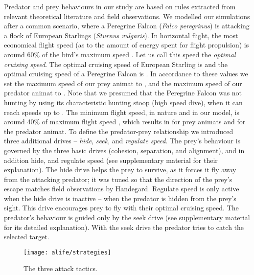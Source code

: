 Predator and prey behaviours in our study are based on rules extracted from relevant theoretical literature and field observations. We modelled our simulations after a common scenario, where a Peregrine Falcon (\emph{Falco peregrinus}) is attacking a flock of European Starlings (\emph{Sturnus vulgaris}). In horizontal flight, the most economical flight speed (as to the amount of energy spent for flight propulsion) is around 60\% of the bird's maximum speed \cite{tennekes2009simple}. Let us call this speed the \emph{optimal cruising speed}. The optimal cruising speed of European Starling is  and the optimal cruising speed of a Peregrine Falcon is  \cite{tennekes2009simple}. In accordance to these values we set the maximum speed of our prey animat to , and the maximum speed of our predator animat to . Note that we presumed that the Peregrine Falcon was not hunting by using its characteristic hunting stoop (high speed dive), when it can reach speeds up to  \cite{tucker1998gliding}. The minimum flight speed, in nature and in our model, is around 40\% of maximum flight speed \cite{tennekes2009simple}, which results in  for prey animats and  for the predator animat. To define the predator-prey relationship we introduced three additional drives -- \emph{hide}, \emph{seek}, and \emph{regulate speed}. The prey's behaviour is governed by the three basic drives (cohesion, separation, and alignment), and in addition hide, and regulate speed (see supplementary material for their explanation). The hide drive helps the prey to survive, as it forces it fly away from the attacking predator; it was tuned so that the direction of the prey's escape matches field observations by Handegard\etal \cite{handegard2012dynamics}. Regulate speed is only active when the hide drive is inactive -- when the predator is hidden from the prey's sight. This drive encourages prey to fly with their optimal cruising speed. The predator's behaviour is guided only by the seek drive (see supplementary material for its detailed explanation). With the seek drive the predator tries to catch the selected target.

\begin{figure}
	\texttt{[image: alife/strategies]}
	\caption{The three attack tactics.}
	\label{figStrategies}
\end{figure}

